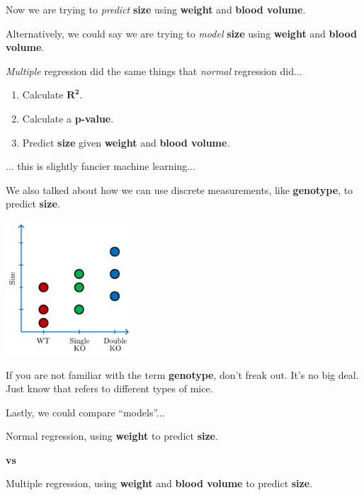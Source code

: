 \documentclass[
	final,
	a4paper,
	oneside,
	parskip=full,
	headings=standardclasses,
	headings=big,
	pointednumbers
]{scrartcl}
\newcommand{\tb}[1]{\textbf{#1}}
\newcommand{\ti}[1]{\textit{#1}}
\begin{document}
    Now we are trying to \ti{predict} \tb{size} using \tb{weight} and \tb{blood volume}.

    Alternatively, we could say we are trying to \ti{model} \tb{size} using \tb{weight} and \tb{blood volume}.

    \ti{Multiple} regression did the same things that \ti{normal} regression did...
    \begin{enumerate}[label=\arabic*)]
        \item{
            Calculate $\bm{R^2}$.
        }
        \item{
            Calculate a \tb{p-value}.
        }
        \item{
            Predict \tb{size} given \tb{weight} and \tb{blood volume}.
        }
    \end{enumerate}
    ... this is slightly fancier machine learning...

    \newpage

    We also talked about how we can use discrete measurements, like
    \tb{genotype}, to predict \tb{size}.

    \begin{center}
        \includegraphics[height=5cm]{StatQuest_Logistic_Regression_Genotype.pdf}
    \end{center}

    If you are not familiar with the term \tb{genotype}, don't freak out.
    It's no big deal. Just know that refers to different types of mice.

    Lastly, we could compare ``models''...

    \begin{minipage}{0.40\textwidth}
        \begin{center}
            Normal regression, using \tb{weight} to predict \tb{size}.
        \end{center}
    \end{minipage}
    \begin{minipage}{0.20\textwidth}
        \begin{center}
            \tb{\LARGE vs}
        \end{center}
    \end{minipage}
    \begin{minipage}{0.40\textwidth}
        \begin{center}
            Multiple regression, using \tb{weight} and \tb{blood volume} to predict \tb{size}.
        \end{center}
    \end{minipage}
\end{document}
